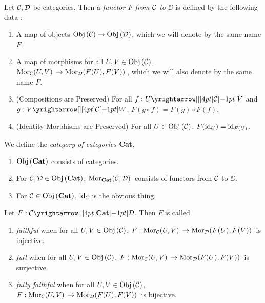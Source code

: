\begin{dfn}[Functors]
  
  Let $\mathcal{C}, \mathcal{D}$ be categories. 
  Then a \emph{functor $F$ from $\mathcal{C}$ to $\DD$} is defined by 
  the following data :
  \begin{enumerate}
    \item A map of objects $\mathrm{Obj}\left(\mathcal{C}\right) \to \mathrm{Obj}\left(\mathcal{D}\right)$,
    which we will denote by the same name $F$. 
    \item A map of morphisms for all $U, V \in \mathrm{Obj}\left(\mathcal{C}\right)$, 
    $\mathrm{Mor}_{\mathcal{C}}(U, V)\, \to \mathrm{Mor}_{\mathcal{D}}(F(U), F(V))\,$,
    which we will also denote by the same name $F$. 
    \item (Compositions are Preserved)
    For all $f : \map{U}{V}{\CC}{}$ and $g : \map{V}{W}{\CC}{}$, 
    $F(g \circ f) = F(g) \circ F(f)$. 
    \item (Identity Morphisms are Preserved)
    For all $U \in \mathrm{Obj}\left(\mathcal{C}\right)$, $F(\mathrm{id}_{U}) = \mathrm{id}_{F(U)}$.
  \end{enumerate}
\end{dfn}

\begin{dfn}\hypertarget{bigcat}{}
  
  We define the \emph{category of categories} $\mathbf{Cat}$, 
  \begin{enumerate}
    \item $\mathrm{Obj}\left(\mathbf{Cat}\right)$ consists of categories. 
    \item For $\mathcal{C}, \mathcal{D} \in \mathrm{Obj}\left(\mathbf{Cat}\right)$, 
    $\mathrm{Mor}_{\mathbf{Cat}}(\mathcal{C}, \mathcal{D})\,$ consists of functors from $\mathcal{C}$ to $\DD$.  
    \item For $\mathcal{C} \in \mathrm{Obj}\left(\mathbf{Cat}\right)$, $\mathrm{id}_{\mathcal{C}}$ is the obvious thing.
  \end{enumerate}
\end{dfn}

\begin{dfn}
  
  Let $F : \map{\CC}{\DD}{\CAT}{}$.
  Then $F$ is called 
  \begin{enumerate}
    \item \emph{faithful} when for all $U, V \in \mathrm{Obj}\left(\mathcal{C}\right)$,
    $F : \mathrm{Mor}_{\mathcal{C}}(U, V)\, \to \mathrm{Mor}_{\mathcal{D}}(F(U), F(V))\,$ is injective. 
    \item \emph{full} when for all $U, V \in \mathrm{Obj}\left(\mathcal{C}\right)$,
    $F : \mathrm{Mor}_{\mathcal{C}}(U, V)\, \to \mathrm{Mor}_{\mathcal{D}}(F(U), F(V))\,$ is surjective.
    \item \emph{fully faithful} when for all $U, V \in \mathrm{Obj}\left(\mathcal{C}\right)$,
    $F : \mathrm{Mor}_{\mathcal{C}}(U, V)\, \to \mathrm{Mor}_{\mathcal{D}}(F(U), F(V))\,$ is bijective.
  \end{enumerate}
\end{dfn}

